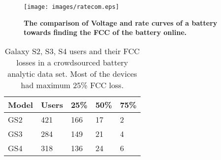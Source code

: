 \documentclass[journal]{IEEEtran}
\begin{document}
\begin{figure}[t]
  \begin{center}
\texttt{[image: images/ratecom.eps]}
    
\caption{{\bf The comparison of Voltage and rate curves of a battery  towards finding the FCC of the battery online.}}
\label{fig:cratemethod}
 \end{center}
 \end{figure}

\begin{table}[t]
\begin{center}
       \caption{Galaxy S2, S3, S4 users and their FCC losses in a crowdsourced battery analytic data set. Most of the devices had maximum 25\% FCC loss.}
           
  {\footnotesize
    \begin{tabular}{|p{8mm}|p{9mm}|p{9mm}|p{9mm}|p{9mm}|}
      \hline      
{Model}& { Users}& {25}\%&{50}\%&{75}\% \\\hline
GS2&421&166&17&	2\\\hline
GS3&284&149&21&	4\\\hline
GS4&318&136&24&	6\\\hline
  \end{tabular}}
          \label{fig:crowd_results}
\end{center}
 
\end{table}
\end{document}
